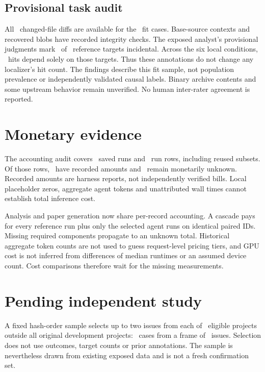 \documentclass[11pt]{article}
\begin{document}
\subsection{Provisional task audit}
All \AuditDiffs\ changed-file diffs are available for the \AuditIssues\ fit cases.
Base-source contexts and recovered blobs have recorded integrity checks. The exposed
analyst's provisional judgments mark \IncidentalTargets\ of \AuditTargets\ reference
targets incidental. Across the six local conditions, \IncidentalOnlyHits\ hits depend
solely on those targets. Thus these annotations do not change any localizer's hit count.
The findings describe this fit sample, not population prevalence or independently
validated causal labels. Binary archive contents and some upstream behavior remain
unverified. No human inter-rater agreement is reported.

\section{Monetary evidence}
The accounting audit covers \CostRuns\ saved runs and \CostRows\ run rows,
including reused subsets. Of those rows, \CostRecorded\ have recorded amounts and
\CostUnknown\ remain monetarily unknown. Recorded amounts are harness reports, not
independently verified bills. Local placeholder zeros, aggregate agent tokens and
unattributed wall times cannot establish total inference cost.

Analysis and paper generation now share per-record accounting. A cascade pays for every
reference run plus only the selected agent runs on identical paired IDs. Missing required
components propagate to an unknown total. Historical aggregate token counts are not used
to guess request-level pricing tiers, and GPU cost is not inferred from differences of
median runtimes or an assumed device count. Cost comparisons therefore wait for the missing
measurements.

\section{Pending independent study}
A fixed hash-order sample selects up to two issues from each of \BroaderProjects\ eligible
projects outside all original development projects: \BroaderIssues\ cases from a frame
of \BroaderFrame\ issues. Selection does not use outcomes, target counts or prior
annotations. The sample is nevertheless drawn from existing exposed data and is not a
fresh confirmation set.
\end{document}
